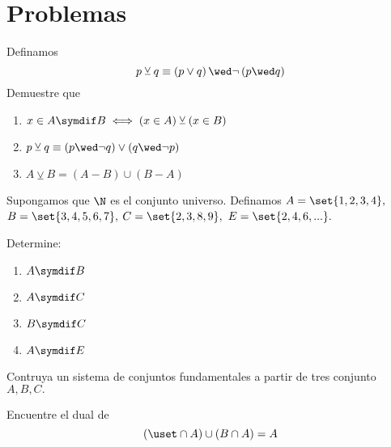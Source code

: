 \section*{Problemas}



\begin{problema}
	Definamos $$p\veebar q \equiv \left( p \vee q \right) \wed \neg\left( p \wed q \right)$$
	Demuestre que 
	\begin{enumerate}
		\item $ \displaystyle
		x \in A\symdif B \iff \left( x \in A \right) \veebar \left( x \in B  \right)
		$ 
		\item $\displaystyle p\veebar q \equiv \left( p \wed \neg q \right) \vee \left( q \wed \neg p \right)$ 
		\item $\displaystyle A \veebar B = \left( A \minus B \right) \cup \left( B \minus A \right)$
	\end{enumerate}
	
\end{problema}

\begin{problema}
	\label{lip:exmp:1.5}
	Supongamos que $\N$ es el conjunto universo. Definamos $A=\set{1,2,3,4},$ $B=\set{3,4,5,6,7},$ $C=\set{2,3,8,9},$ $E=\set{2,4,6,...}.$
	
	Determine:
	\begin{enumerate}
		\item $A \symdif B$ 
		\item $A \symdif C$ 
		\item $B \symdif C$ 
		\item $A \symdif E$
	\end{enumerate}
\end{problema}


\begin{problema}
	\label{lip:exmo:1.6}
	Contruya un sistema de conjuntos fundamentales a partir de tres conjunto $A, B, C.$  
\end{problema}


\begin{problema}
	Encuentre el dual de 
	\[ (\uset \cap A) \cup (B\cap A) = A\]
\end{problema}